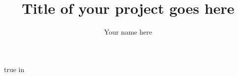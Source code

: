 \documentclass[12pt,letterpaper,final]{report}
\author{Your name here}
\title{Title of your project goes here}
\theoremstyle{definition}
\begin{document}
    \maketitle

    \newpage    
    
    

    \tableofcontents
    \listoffigures
    \listoftables

     true in

    \newpage

        
                
    
    
    

    \begin{singlespace}
        
        
    \end{singlespace}

    \printglossary   
\end{document}
